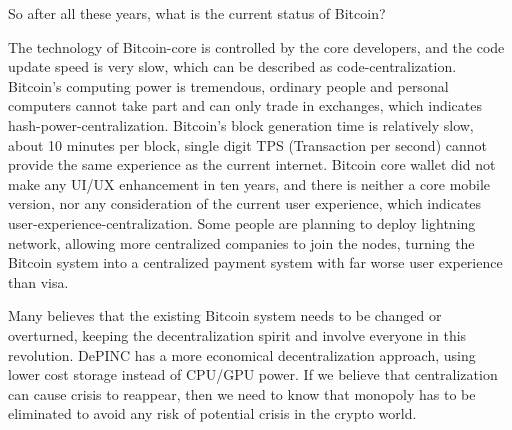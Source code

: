 \begin{flushleft}
    So after all these years, what is the current status of Bitcoin?
\end{flushleft}
\begin{flushleft}
    The technology of Bitcoin-core is controlled by the core developers, and the code update speed is very slow, which can be described as code-centralization. Bitcoin's computing power is tremendous, ordinary people and personal computers cannot take part and can only trade in exchanges, which indicates hash-power-centralization. Bitcoin's block generation time is relatively slow, about 10 minutes per block, single digit TPS (Transaction per second) cannot provide the same experience as the current internet. Bitcoin core wallet did not make any UI/UX enhancement in ten years, and there is neither a core mobile version, nor any consideration of the current user experience, which indicates user-experience-centralization. Some people are planning to deploy lightning network, allowing more centralized companies to join the nodes, turning the Bitcoin system into a centralized payment system with far worse user experience than visa.
\end{flushleft}
\begin{flushleft}
    Many believes that the existing Bitcoin system needs to be changed or overturned, keeping the decentralization spirit and involve everyone in this revolution. DePINC has a more economical decentralization approach, using lower cost storage instead of CPU/GPU power. If we believe that centralization can cause crisis to reappear, then we need to know that monopoly has to be eliminated to avoid any risk of potential crisis in the crypto world.
\end{flushleft}
